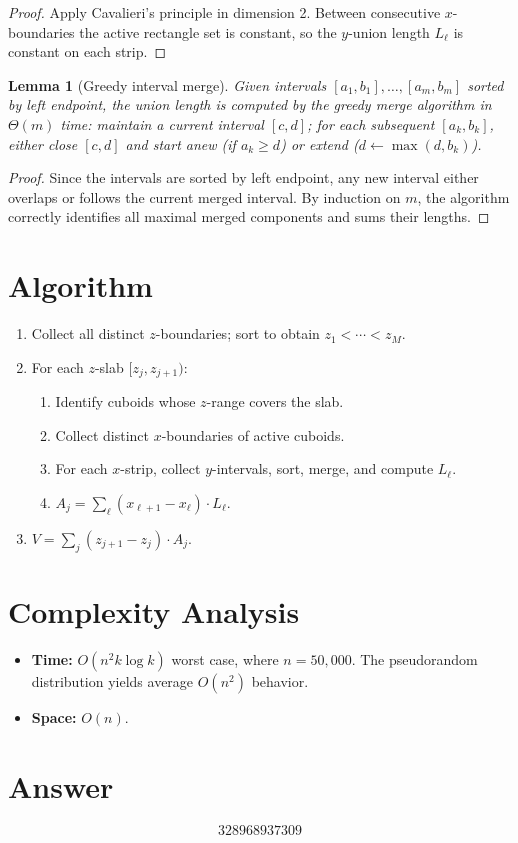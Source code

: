 \documentclass[12pt]{article}
\newtheorem{lemma}[theorem]{Lemma}
\theoremstyle{definition}
\begin{document}
\begin{proof}
Apply Cavalieri's principle in dimension 2. Between consecutive $x$-boundaries the active rectangle set is constant, so the $y$-union length $L_\ell$ is constant on each strip.
\end{proof}

\begin{lemma}[Greedy interval merge]
Given intervals $[a_1,b_1],\ldots,[a_m,b_m]$ sorted by left endpoint, the union length is computed by the greedy merge algorithm in $\Theta(m)$ time: maintain a current interval $[c,d]$; for each subsequent $[a_k,b_k]$, either close $[c,d]$ and start anew (if $a_k \geq d$) or extend ($d \leftarrow \max(d,b_k)$).
\end{lemma}

\begin{proof}
Since the intervals are sorted by left endpoint, any new interval either overlaps or follows the current merged interval. By induction on $m$, the algorithm correctly identifies all maximal merged components and sums their lengths.
\end{proof}

\section{Algorithm}

\begin{enumerate}
\item Collect all distinct $z$-boundaries; sort to obtain $z_1 < \cdots < z_M$.
\item For each $z$-slab $[z_j, z_{j+1})$:
  \begin{enumerate}
  \item Identify cuboids whose $z$-range covers the slab.
  \item Collect distinct $x$-boundaries of active cuboids.
  \item For each $x$-strip, collect $y$-intervals, sort, merge, and compute $L_\ell$.
  \item $A_j = \sum_\ell (x_{\ell+1}-x_\ell) \cdot L_\ell$.
  \end{enumerate}
\item $V = \sum_j (z_{j+1}-z_j) \cdot A_j$.
\end{enumerate}

\section{Complexity Analysis}

\begin{itemize}
\item \textbf{Time:} $O(n^2 k \log k)$ worst case, where $n=50{,}000$. The pseudorandom distribution yields average $O(n^2)$ behavior.
\item \textbf{Space:} $O(n)$.
\end{itemize}

\section{Answer}

\[
\boxed{328968937309}
\]
\end{document}

